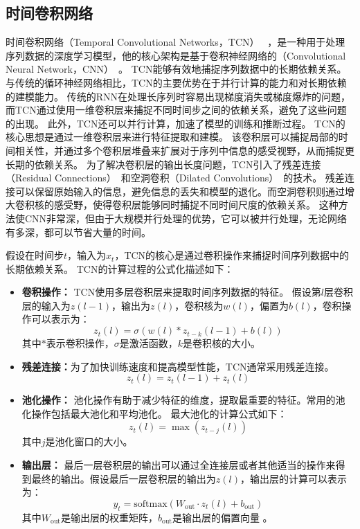 \subsection{时间卷积网络}
时间卷积网络（Temporal Convolutional Networks，TCN） ~\cite{bai2018empirical}，是一种用于处理序列数据的深度学习模型，他的核心架构是基于卷积神经网络的（Convolutional Neural Network，CNN）~\cite{schmidhuber2015deep}。
TCN能够有效地捕捉序列数据中的长期依赖关系。
与传统的循环神经网络相比，TCN的主要优势在于并行计算的能力和对长期依赖的建模能力。
传统的RNN在处理长序列时容易出现梯度消失或梯度爆炸的问题，而TCN通过使用一维卷积层来捕捉不同时间步之间的依赖关系，避免了这些问题的出现。
此外，TCN还可以并行计算，加速了模型的训练和推断过程。
TCN的核心思想是通过一维卷积层来进行特征提取和建模。
该卷积层可以捕捉局部的时间相关性，并通过多个卷积层堆叠来扩展对于序列中信息的感受视野，从而捕捉更长期的依赖关系。
为了解决卷积层的输出长度问题，TCN引入了残差连接（Residual Connections）~\cite{he2016deep}和空洞卷积（Dilated Convolutions）~\cite{yu2015multi}的技术。
残差连接可以保留原始输入的信息，避免信息的丢失和模型的退化。而空洞卷积则通过增大卷积核的感受野，使得卷积层能够同时捕捉不同时间尺度的依赖关系。
这种方法使CNN非常深，但由于大规模并行处理的优势，它可以被并行处理，无论网络有多深，都可以节省大量的时间。

假设在时间步$t$，输入为$x_t$，TCN的核心是通过卷积操作来捕捉时间序列数据中的长期依赖关系。
TCN的计算过程的公式化描述如下：
\begin{itemize}
    \item \textbf{卷积操作：} TCN使用多层卷积层来提取时间序列数据的特征。
    假设第$l$层卷积层的输入为$z(l-1)$，输出为$z(l)$，卷积核为$w(l)$，偏置为$b(l)$，卷积操作可以表示为：
    \begin{equation}
        z_t(l) = \sigma(w(l) \ast z_{t-k}(l-1) + b(l))
    \end{equation}
    其中$\ast$表示卷积操作，$\sigma$是激活函数，$k$是卷积核的大小。

    \item \textbf{残差连接：}为了加快训练速度和提高模型性能，TCN通常采用残差连接。
    \begin{equation}
        z_t(l) = z_t(l-1) + z_t(l)
    \end{equation}

    \item  \textbf{池化操作：} 池化操作有助于减少特征的维度，提取最重要的特征。常用的池化操作包括最大池化和平均池化。
    最大池化的计算公式如下：
    \begin{equation}
        z_t(l) = \max(z_{t-j}(l))
    \end{equation}
    其中$j$是池化窗口的大小。

    \item \textbf{输出层：} 最后一层卷积层的输出可以通过全连接层或者其他适当的操作来得到最终的输出。假设最后一层卷积层的输出为$z(l)$，输出层的计算可以表示为：
    \begin{equation}
        y_t = \text{softmax}(W_{\text{out}} \cdot z_t(l) + b_{\text{out}})
    \end{equation}
    其中$W_{\text{out}}$是输出层的权重矩阵，$b_{\text{out}}$是输出层的偏置向量 。
\end{itemize}



